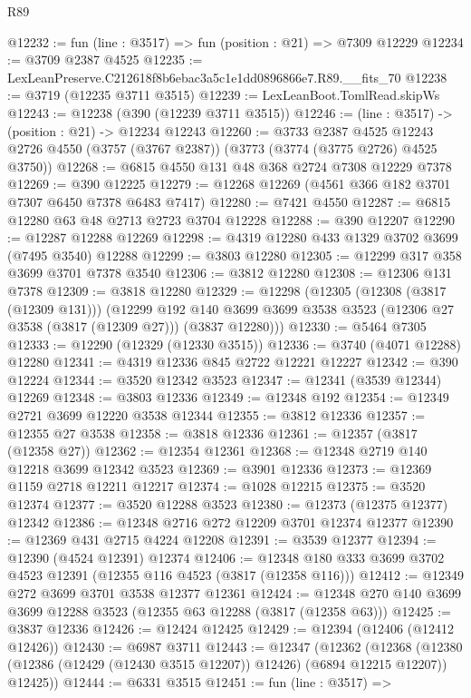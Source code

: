 \begin{lexlean}{R89}
\begin{coremodule}
@12232 := fun (line : @3517) => fun (position : @21) => @7309 @12229
@12234 := @3709 @2387 @4525
@12235 := LexLeanPreserve.C212618f8b6ebac3a5c1e1dd0896866e7.R89.__fits_70
@12238 := @3719 (@12235 @3711 @3515)
@12239 := LexLeanBoot.TomlRead.skipWs
@12243 := @12238 (@390 (@12239 @3711 @3515))
@12246 := (line : @3517) -> (position : @21) -> @12234 @12243
@12260 := @3733
    @2387
    @4525
    @12243
    @2726
    @4550
    (@3757 (@3767 @2387))
    (@3773 (@3774 (@3775 @2726) @4525 @3750))
@12268 := @6815 @4550 @131 @48 @368 @2724 @7308 @12229 @7378
@12269 := @390 @12225
@12279 := @12268 @12269 (@4561 @366 @182 @3701 @7307 @6450 @7378 @6483 @7417)
@12280 := @7421 @4550
@12287 := @6815 @12280 @63 @48 @2713 @2723 @3704 @12228
@12288 := @390 @12207
@12290 := @12287 @12288 @12269
@12298 := @4319 @12280 @433 @1329 @3702 @3699 (@7495 @3540) @12288
@12299 := @3803 @12280
@12305 := @12299 @317 @358 @3699 @3701 @7378 @3540
@12306 := @3812 @12280
@12308 := @12306 @131 @7378
@12309 := @3818 @12280
@12329 := @12298
    (@12305
      (@12308 (@3817 (@12309 @131)))
      (@12299
        @192
        @140
        @3699
        @3699
        @3538
        @3523
        (@12306 @27 @3538 (@3817 (@12309 @27)))
        (@3837 @12280)))
@12330 := @5464 @7305
@12333 := @12290 (@12329 (@12330 @3515))
@12336 := @3740 (@4071 @12288) @12280
@12341 := @4319 @12336 @845 @2722 @12221 @12227
@12342 := @390 @12224
@12344 := @3520 @12342 @3523
@12347 := @12341 (@3539 @12344) @12269
@12348 := @3803 @12336
@12349 := @12348 @192
@12354 := @12349 @2721 @3699 @12220 @3538 @12344
@12355 := @3812 @12336
@12357 := @12355 @27 @3538
@12358 := @3818 @12336
@12361 := @12357 (@3817 (@12358 @27))
@12362 := @12354 @12361
@12368 := @12348 @2719 @140 @12218 @3699 @12342 @3523
@12369 := @3901 @12336
@12373 := @12369 @1159 @2718 @12211 @12217
@12374 := @1028 @12215
@12375 := @3520 @12374
@12377 := @3520 @12288 @3523
@12380 := @12373 (@12375 @12377) @12342
@12386 := @12348 @2716 @272 @12209 @3701 @12374 @12377
@12390 := @12369 @431 @2715 @4224 @12208
@12391 := @3539 @12377
@12394 := @12390 (@4524 @12391) @12374
@12406 := @12348 @180 @333 @3699 @3702 @4523 @12391 (@12355 @116 @4523 (@3817 (@12358 @116)))
@12412 := @12349 @272 @3699 @3701 @3538 @12377 @12361
@12424 := @12348 @270 @140 @3699 @3699 @12288 @3523 (@12355 @63 @12288 (@3817 (@12358 @63)))
@12425 := @3837 @12336
@12426 := @12424 @12425
@12429 := @12394 (@12406 (@12412 @12426))
@12430 := @6987 @3711
@12443 := @12347
    (@12362
      (@12368 (@12380 (@12386 (@12429 (@12430 @3515 @12207)) @12426) (@6894 @12215 @12207)) @12425))
@12444 := @6331 @3515
@12451 := fun (line : @3517) =>

\end{coremodule}
\end{lexlean}
